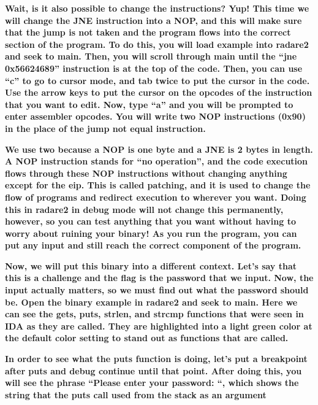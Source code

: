 \textbf{Wait, is it also possible to change the instructions? Yup! This time we will change the JNE instruction into a
NOP, and this will make sure that the jump is not taken and the program flows into the correct section of the program.
To do this, you will load example into radare2 and seek to main. Then, you will scroll through main until the ``jne
0x56624689'' instruction is at the top of the code. Then, you can use ``c'' to go to cursor mode, and tab twice to put
the cursor in the code. Use the arrow keys to put the cursor on the opcodes of the instruction that you want to edit.
Now, type ``a'' and you will be prompted to enter assembler opcodes.  You will write two NOP instructions (0x90) in the
place of the jump not equal instruction.}

  
 

  
 

\textbf{We use two because a NOP is one byte and a JNE is 2 bytes in length. A NOP instruction stands for ``no
operation'', and the code execution flows through these NOP instructions without changing anything except for the eip.
This is called patching, and it is used to change the flow of programs and redirect execution to wherever you want.
Doing this in radare2 in debug mode will not change this permanently, however, so you can test anything that you want
without having to worry about ruining your binary! As you run the program, you can put any input and still reach the
correct component of the program.}

\textbf{Now, we will put this binary into a different context. Let's say that this is a challenge and the flag is the
password that we input. Now, the input actually matters, so we must find out what the password should be. Open the
binary example in radare2 and seek to main. Here we can see the gets, puts, strlen, and strcmp functions that were seen
in IDA as they are called. They are highlighted into a light green color at the default color setting to stand out as
functions that are called.}

  
 

\textbf{In order to see what the puts function is doing, let's put a breakpoint after puts and debug continue until that
point. After doing this, you will see the phrase ``Please enter your password: ``, which shows the string that the puts
call used from the stack as an argument}

